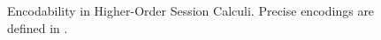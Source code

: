 \begin{figure}[t]
%
	\caption{Encodability in Higher-Order Session Calculi. 
	Precise encodings are defined in .
	\label{fig:express}}
\Hlinefig
\end{figure}

\smallskip

